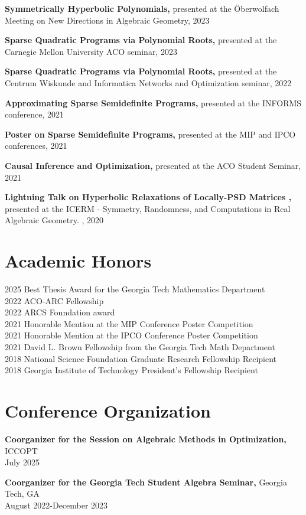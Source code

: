 \documentclass[10pt, letterpaper]{article}
\begin{document}
{\bf  Symmetrically Hyperbolic Polynomials,} presented at the \"Oberwolfach Meeting on New Directions in Algebraic Geometry, 2023 

{\bf  Sparse Quadratic Programs via Polynomial Roots,} presented at the Carnegie Mellon University ACO seminar, 2023 

{\bf  Sparse Quadratic Programs via Polynomial Roots,} presented at the Centrum Wiskunde and Informatica Networks and Optimization seminar, 2022 

{\bf  Approximating Sparse Semidefinite Programs,} presented at the INFORMS conference, 2021 

{\bf  Poster on Sparse Semidefinite Programs,} presented at the MIP and IPCO conferences, 2021 

{\bf  Causal Inference and Optimization,} presented at the ACO Student Seminar, 2021

{\bf  Lightning Talk on Hyperbolic Relaxations of Locally-PSD Matrices ,} presented at the ICERM - Symmetry, Randomness, and Computations in Real Algebraic Geometry.
, 2020



\section{Academic Honors} 
2025 Best Thesis Award for the Georgia Tech Mathematics Department\\
2022 ACO-ARC Fellowship\\
2022 ARCS Foundation award\\
2021 Honorable Mention at the MIP Conference Poster Competition\\
2021 Honorable Mention at the IPCO Conference Poster Competition\\
2021 David L. Brown Fellowship from the Georgia Tech Math Department\\
2018 National Science Foundation Graduate Research Fellowship Recipient\\
2018 Georgia Institute of Technology President's Fellowship Recipient

\section{Conference Organization}
{\bf Coorganizer for the Session on Algebraic Methods in Optimization,} ICCOPT    \\       July 2025

{\bf Coorganizer for the Georgia Tech Student Algebra Seminar,} Georgia Tech, GA    \\       August 2022-December 2023
\end{document}
